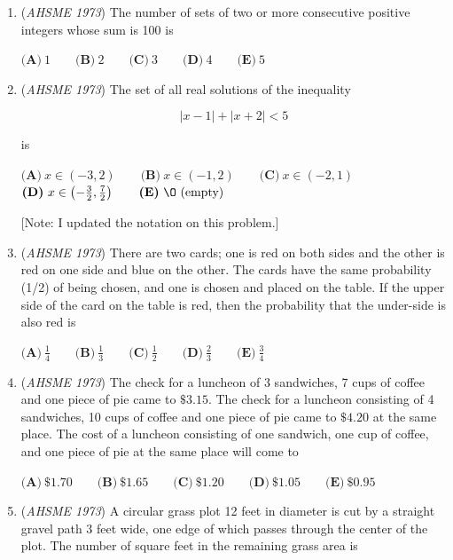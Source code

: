 \begin{enumerate}
 $\textbf{(A)}\ 4+\sqrt{185} \qquad \textbf{(B)}\ 16 \qquad \textbf{(C)}\ 17 \qquad \textbf{(D)}\ 18 \qquad \textbf{(E)}\ \sqrt{32}+\sqrt{137}$


	\item (\textit{AHSME 1973}) The number of sets of two or more consecutive positive integers whose sum is 100 is


 $\textbf{(A)}\ 1 \qquad \textbf{(B)}\ 2 \qquad \textbf{(C)}\ 3 \qquad \textbf{(D)}\ 4 \qquad \textbf{(E)}\ 5$


	\item (\textit{AHSME 1973}) The set of all real solutions of the inequality 


 
 \[|x - 1| + |x + 2| < 5\]


 is 


 $\textbf{(A)}\ x \in ( - 3,2) \qquad \textbf{(B)}\ x \in ( - 1,2) \qquad \textbf{(C)}\ x \in ( - 2,1) \qquad$
$\textbf{(D)}\ x \in \left( - \frac32,\frac72\right) \qquad \textbf{(E)}\ \O \text{ (empty})$


 [Note: I updated the notation on this problem.]	


 

	\item (\textit{AHSME 1973}) There are two cards; one is red on both sides and the other is red on one side and blue on the other. The cards have the same probability (1/2) of being chosen, and one is chosen and placed on the table. If the upper side of the card on the table is red, then the probability that the under-side is also red is 


 $\textbf{(A)}\ \frac14 \qquad \textbf{(B)}\ \frac13 \qquad \textbf{(C)}\ \frac12 \qquad \textbf{(D)}\ \frac23 \qquad \textbf{(E)}\ \frac34$


	\item (\textit{AHSME 1973}) The check for a luncheon of 3 sandwiches, 7 cups of coffee and one piece of pie came to $\$3.15$. The check for a luncheon consisting of 4 sandwiches, 10 cups of coffee and one piece of pie came to $\$4.20$ at the same place. The cost of a luncheon consisting of one sandwich, one cup of coffee, and one piece of pie at the same place will come to 


 $\textbf{(A)}\ \$1.70 \qquad \textbf{(B)}\ \$1.65 \qquad \textbf{(C)}\ \$1.20 \qquad \textbf{(D)}\ \$1.05 \qquad \textbf{(E)}\ \$0.95$


	\item (\textit{AHSME 1973}) A circular grass plot 12 feet in diameter is cut by a straight gravel path 3 feet wide, one edge of which passes through the center of the plot. The number of square feet in the remaining grass area is 



\end{enumerate}
